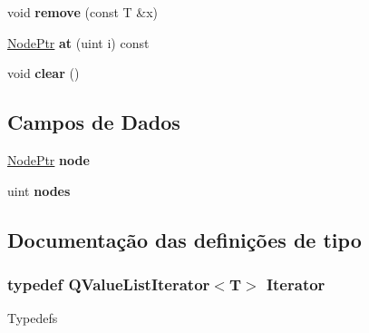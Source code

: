 \begin{DoxyCompactItemize}
\item 
\hypertarget{class_q_value_list_private_a7d0f9d48602dc2fb3b4e5e8f4632ba5a}{void {\bfseries remove} (const T \&x)}\label{class_q_value_list_private_a7d0f9d48602dc2fb3b4e5e8f4632ba5a}

\item 
\hypertarget{class_q_value_list_private_aa93e6243c41f3b21b517c9f0cffe9ccb}{\hyperlink{class_q_value_list_node}{Node\-Ptr} {\bfseries at} (uint i) const }\label{class_q_value_list_private_aa93e6243c41f3b21b517c9f0cffe9ccb}

\item 
\hypertarget{class_q_value_list_private_ac8bb3912a3ce86b15842e79d0b421204}{void {\bfseries clear} ()}\label{class_q_value_list_private_ac8bb3912a3ce86b15842e79d0b421204}

\end{DoxyCompactItemize}
\subsection*{Campos de Dados}
\begin{DoxyCompactItemize}
\item 
\hypertarget{class_q_value_list_private_af543614539e0077318342ca740f88513}{\hyperlink{class_q_value_list_node}{Node\-Ptr} {\bfseries node}}\label{class_q_value_list_private_af543614539e0077318342ca740f88513}

\item 
\hypertarget{class_q_value_list_private_a868d07698ad5360279d73784e12b0e01}{uint {\bfseries nodes}}\label{class_q_value_list_private_a868d07698ad5360279d73784e12b0e01}

\end{DoxyCompactItemize}


\subsection{Documentação das definições de tipo}
\hypertarget{class_q_value_list_private_a1f559ae0c1d2e8f55846ea5d1ea60977}{
\subsubsection[{Iterator}]{\setlength{\rightskip}{0pt plus 5cm}typedef {\bf Q\-Value\-List\-Iterator}$<$T$>$ {\bf Iterator}}}\label{class_q_value_list_private_a1f559ae0c1d2e8f55846ea5d1ea60977}
Typedefs 

